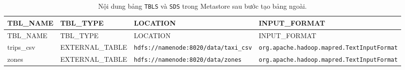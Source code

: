 \documentclass[
  12pt,
  a4paper,
]{report}
\begin{document}
\begin{longtable}[]{@{}
  >{\raggedright\arraybackslash}p{}
  >{\raggedright\arraybackslash}p{}
  >{\raggedright\arraybackslash}p{}
  >{\raggedright\arraybackslash}p{}@{}}
\caption{\label{tbl:l03-metastore}Nội dung bảng \texttt{TBLS} và
\texttt{SDS} trong Metastore sau bước tạo bảng ngoài.}\tabularnewline
\toprule\noalign{}
\begin{minipage}[b]{\linewidth}\raggedright
TBL\_NAME
\end{minipage} & \begin{minipage}[b]{\linewidth}\raggedright
TBL\_TYPE
\end{minipage} & \begin{minipage}[b]{\linewidth}\raggedright
LOCATION
\end{minipage} & \begin{minipage}[b]{\linewidth}\raggedright
INPUT\_FORMAT
\end{minipage} \\
\midrule\noalign{}
\endfirsthead
\toprule\noalign{}
\begin{minipage}[b]{\linewidth}\raggedright
TBL\_NAME
\end{minipage} & \begin{minipage}[b]{\linewidth}\raggedright
TBL\_TYPE
\end{minipage} & \begin{minipage}[b]{\linewidth}\raggedright
LOCATION
\end{minipage} & \begin{minipage}[b]{\linewidth}\raggedright
INPUT\_FORMAT
\end{minipage} \\
\midrule\noalign{}
\endhead
\bottomrule\noalign{}
\endlastfoot
trips\_csv & EXTERNAL\_TABLE &
\texttt{hdfs:}\allowbreak{}\texttt{/}\allowbreak{}\texttt{/}\allowbreak{}\texttt{namenode:}\allowbreak{}\texttt{8020/}\allowbreak{}\texttt{data/}\allowbreak{}\texttt{taxi\_}\allowbreak{}\texttt{csv}\allowbreak{}
&
\texttt{org.}\allowbreak{}\texttt{apache.}\allowbreak{}\texttt{hadoop.}\allowbreak{}\texttt{mapred.}\allowbreak{}\texttt{TextInputFormat}\allowbreak{} \\
zones & EXTERNAL\_TABLE &
\texttt{hdfs:}\allowbreak{}\texttt{/}\allowbreak{}\texttt{/}\allowbreak{}\texttt{namenode:}\allowbreak{}\texttt{8020/}\allowbreak{}\texttt{data/}\allowbreak{}\texttt{zones}\allowbreak{}
&
\texttt{org.}\allowbreak{}\texttt{apache.}\allowbreak{}\texttt{hadoop.}\allowbreak{}\texttt{mapred.}\allowbreak{}\texttt{TextInputFormat}\allowbreak{} \\
\end{longtable}
\end{document}
